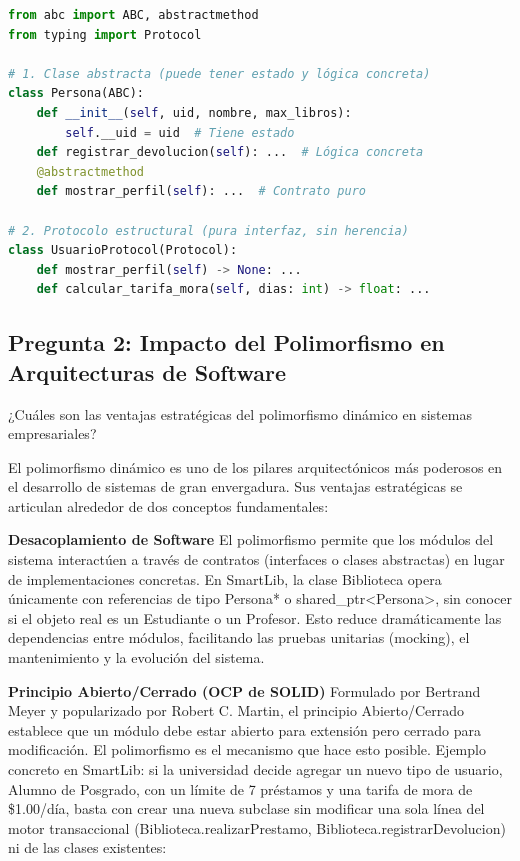 \documentclass[12pt,a4paper]{article}
\begin{document}
\begin{lstlisting}[language=Python]
from abc import ABC, abstractmethod
from typing import Protocol

# 1. Clase abstracta (puede tener estado y lógica concreta)
class Persona(ABC):
    def __init__(self, uid, nombre, max_libros):
        self.__uid = uid  # Tiene estado
    def registrar_devolucion(self): ...  # Lógica concreta
    @abstractmethod
    def mostrar_perfil(self): ...  # Contrato puro

# 2. Protocolo estructural (pura interfaz, sin herencia)
class UsuarioProtocol(Protocol):
    def mostrar_perfil(self) -> None: ...
    def calcular_tarifa_mora(self, dias: int) -> float: ...
\end{lstlisting}

\subsection{Pregunta 2: Impacto del Polimorfismo en Arquitecturas de Software}
¿Cuáles son las ventajas estratégicas del polimorfismo dinámico en sistemas empresariales?

El polimorfismo dinámico es uno de los pilares arquitectónicos más poderosos en el desarrollo de sistemas de gran envergadura. Sus ventajas estratégicas se articulan alrededor de dos conceptos fundamentales:

\textbf{Desacoplamiento de Software}
El polimorfismo permite que los módulos del sistema interactúen a través de contratos (interfaces o clases abstractas) en lugar de implementaciones concretas. En SmartLib, la clase Biblioteca opera únicamente con referencias de tipo Persona* o shared\_ptr<Persona>, sin conocer si el objeto real es un Estudiante o un Profesor. Esto reduce dramáticamente las dependencias entre módulos, facilitando las pruebas unitarias (mocking), el mantenimiento y la evolución del sistema.

\textbf{Principio Abierto/Cerrado (OCP de SOLID)}
Formulado por Bertrand Meyer y popularizado por Robert C. Martin, el principio Abierto/Cerrado establece que un módulo debe estar abierto para extensión pero cerrado para modificación. El polimorfismo es el mecanismo que hace esto posible. Ejemplo concreto en SmartLib: si la universidad decide agregar un nuevo tipo de usuario, Alumno de Posgrado, con un límite de 7 préstamos y una tarifa de mora de \$1.00/día, basta con crear una nueva subclase sin modificar una sola línea del motor transaccional (Biblioteca.realizarPrestamo, Biblioteca.registrarDevolucion) ni de las clases existentes:
\end{document}
